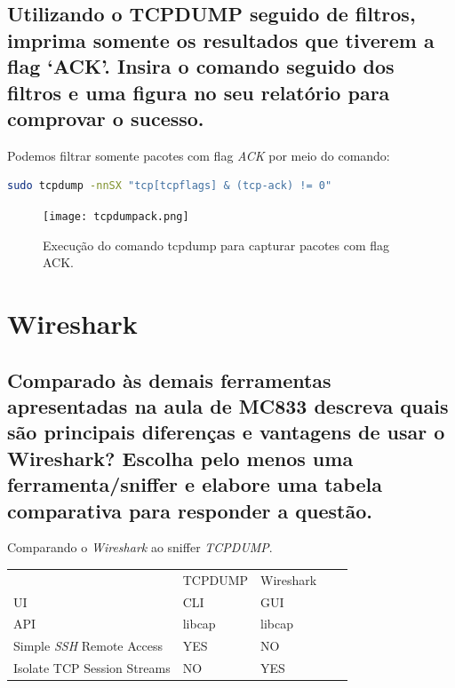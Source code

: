 \documentclass[12pt,a4paper]{report}
\begin{document}
\subsection{Utilizando o TCPDUMP seguido de filtros, imprima somente os resultados que tiverem a flag ‘ACK’. Insira o comando seguido dos filtros e uma figura no seu relatório para comprovar o sucesso.}

Podemos filtrar somente pacotes com flag \emph{ACK} por meio do comando:

\begin{lstlisting}[language=bash]
sudo tcpdump -nnSX "tcp[tcpflags] & (tcp-ack) != 0"
\end{lstlisting}


\begin{figure}[H]
        \texttt{[image: tcpdumpack.png]}
        \caption{Execução do comando tcpdump para capturar pacotes com flag ACK.}
\end{figure}

\section{Wireshark}


\subsection{Comparado às demais ferramentas apresentadas na aula de MC833 descreva quais são principais diferenças e vantagens de usar o Wireshark? Escolha pelo menos uma ferramenta/sniffer e elabore uma tabela comparativa para responder a questão.}

Comparando o \emph{Wireshark} ao sniffer \emph{TCPDUMP}.


\begin{table}[H]
        \begin{tabular}{|l|l|lll}
                \cline{1-3}
                                                & TCPDUMP & \multicolumn{1}{l|}{Wireshark} &  & \\ \cline{1-3}
                UI                              & CLI     & \multicolumn{1}{l|}{GUI}       &  & \\ \cline{1-3}
                API                             & libcap  & \multicolumn{1}{l|}{libcap}    &  & \\ \cline{1-3}
                Simple \emph{SSH} Remote Access & YES     & \multicolumn{1}{l|}{NO}        &  & \\ \cline{1-3}
                Isolate TCP Session Streams     & NO      & \multicolumn{1}{l|}{YES}       &  & \\ \cline{1-3}
        \end{tabular}
\end{table}
\end{document}
